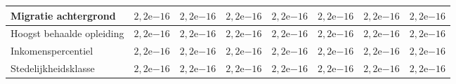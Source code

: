\documentclass[12pt, letterpaper]{article}
\begin{document}
\begin{appendices}
\begin{table}[H]
\begin{center}
{{\begin{tabular}{|R{2.5cm}||C{1.4cm}||C{1.4cm}|C{1.4cm}|C{1.4cm}||C{1.4cm}|C{1.4cm}|C{1.4cm}|}
            \hline
            Migratie achtergrond  &  $2,2\mathrm{e}{-16}$ &   $2,2\mathrm{e}{-16}$ &   $2,2\mathrm{e}{-16}$ &   $2,2\mathrm{e}{-16}$ &   $2,2\mathrm{e}{-16}$ &   $2,2\mathrm{e}{-16}$&   $2,2\mathrm{e}{-16}$\\
            \hline
            Hoogst behaalde opleiding  &  $2,2\mathrm{e}{-16}$ &   $2,2\mathrm{e}{-16}$ &   $2,2\mathrm{e}{-16}$ &   $2,2\mathrm{e}{-16}$ &   $2,2\mathrm{e}{-16}$ &  $2,2\mathrm{e}{-16}$&  $2,2\mathrm{e}{-16}$\\
            \hline
            Inkomenspercentiel & $2,2\mathrm{e}{-16}$ &  $2,2\mathrm{e}{-16}$ &  $2,2\mathrm{e}{-16}$ &  $2,2\mathrm{e}{-16}$ &  $2,2\mathrm{e}{-16}$ &  $2,2\mathrm{e}{-16}$&  $2,2\mathrm{e}{-16}$\\
            \hline
            Stedelijkheidsklasse  & $2,2\mathrm{e}{-16}$ &  $2,2\mathrm{e}{-16}$ &  $2,2\mathrm{e}{-16}$ &  $2,2\mathrm{e}{-16}$ &  $2,2\mathrm{e}{-16}$ &  $2,2\mathrm{e}{-16}$&  $2,2\mathrm{e}{-16}$\\
            \hline
        \end{tabular}}
    \label{res01}
    }
    \end{center}
\end{table}
\begin{table}[H]
    \begin{center}
    \small
\end{center}
\end{table}
\end{appendices}
\end{document}
